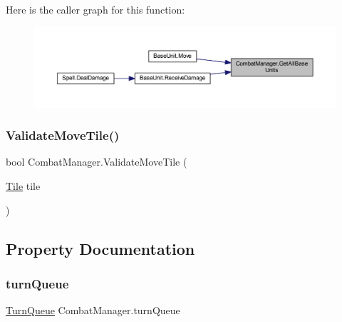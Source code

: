 Here is the caller graph for this function\+:\nopagebreak
\begin{figure}[H]
\begin{center}
\leavevmode
\includegraphics[width=350pt]{class_combat_manager_a02eb44e3f4fab4f210d4ecda54fa1272_icgraph}
\end{center}
\end{figure}
\mbox{\label{class_combat_manager_a6f648795292255b600e92eefcf960ded}} 
\subsubsection{\texorpdfstring{ValidateMoveTile()}{ValidateMoveTile()}}
{\footnotesize\ttfamily bool Combat\+Manager.\+Validate\+Move\+Tile (\begin{DoxyParamCaption}\item[{\mbox{\hyperlink{class_tile}{Tile}}}]{tile }\end{DoxyParamCaption})}



\subsection{Property Documentation}
\mbox{\label{class_combat_manager_a6316ac49fbaf2e16426313d12749761d}} 
\subsubsection{\texorpdfstring{turnQueue}{turnQueue}}
{\footnotesize\ttfamily \mbox{\hyperlink{class_turn_queue}{Turn\+Queue}} Combat\+Manager.\+turn\+Queue\hspace{0.3cm}{\ttfamily [get]}}

